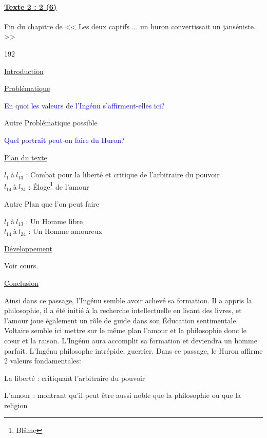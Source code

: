 \documentclass[12pt,a4paper]{article}
\begin{document}
							\paragraph[Texte 2 (6)]{\textbf{\underline{Texte 2 : 2 (6) }}}
		Fin du chapitre \textsc{} de << Les deux captifs ... un huron convertissait un janséniste. >>
\begin{dingautolist}{192}

\item \underline{Introduction} \par

\item \underline{Probl\'ematique }\par
	\textcolor{blue}{En quoi les valeurs de l'Ingénu s'affirment-elles ici?}\par
	Autre Problématique possible \par
	\textcolor{blue}{Quel portrait peut-on faire du Huron?}


\item \underline{Plan du texte} \par
	$l_{1}~$\`a$~l_{13}$ : Combat pour la liberté et critique de l'arbitraire du pouvoir\\
    $l_{14}~$\`a$~l_{24}$ : \'Eloge\footnote{Blâme} de l'amour \par
Autre Plan que l'on peut faire\par
	$l_{1}~$\`a$~l_{13}$ : Un Homme libre\\
    $l_{14}~$\`a$~l_{24}$ : Un Homme amoureux


\item \underline{D\'eveloppement} \par
        Voir cours.

\item \underline{Conclusion} \par
	Ainsi dans ce passage, l'Ingénu semble avoir achevé sa formation.
	Il a appris la philosophie, il a été initié à la recherche intellectuelle en lisant des livres, et l'amour joue également un rôle de guide dans son \'Education sentimentale. 
	Voltaire semble ici mettre sur le même plan l'amour et la philosophie donc le c\oe ur et la raison.
	L'Ingénu aura accomplit sa formation et deviendra un homme parfait.
	L'Ingénu philosophe intrépide, guerrier.
	Dans ce passage, le Huron affirme 2 valeurs fondamentales:\par
	La liberté : critiquant l'arbitraire du pouvoir\par
	L'amour : montrant qu'il peut être aussi noble que la philosophie ou que la religion \par

\end{dingautolist}
 \newpage
\end{document}
